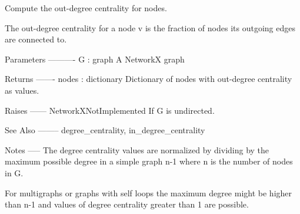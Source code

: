 \begin{DoxyVerb}Compute the out-degree centrality for nodes.

The out-degree centrality for a node v is the fraction of nodes its
outgoing edges are connected to.

Parameters
----------
G : graph
    A NetworkX graph

Returns
-------
nodes : dictionary
    Dictionary of nodes with out-degree centrality as values.

Raises
------
NetworkXNotImplemented
    If G is undirected.

See Also
--------
degree_centrality, in_degree_centrality

Notes
-----
The degree centrality values are normalized by dividing by the maximum
possible degree in a simple graph n-1 where n is the number of nodes in G.

For multigraphs or graphs with self loops the maximum degree might
be higher than n-1 and values of degree centrality greater than 1
are possible.
\end{DoxyVerb}
 